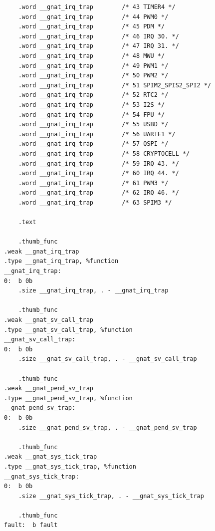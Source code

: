 \documentclass{article}
\begin{document}
\begin{lstlisting}
	.word __gnat_irq_trap        /* 43 TIMER4 */
	.word __gnat_irq_trap        /* 44 PWM0 */
	.word __gnat_irq_trap        /* 45 PDM */
	.word __gnat_irq_trap        /* 46 IRQ 30. */
	.word __gnat_irq_trap        /* 47 IRQ 31. */
	.word __gnat_irq_trap        /* 48 MWU */
	.word __gnat_irq_trap        /* 49 PWM1 */
	.word __gnat_irq_trap        /* 50 PWM2 */
	.word __gnat_irq_trap        /* 51 SPIM2_SPIS2_SPI2 */
	.word __gnat_irq_trap        /* 52 RTC2 */
	.word __gnat_irq_trap        /* 53 I2S */
	.word __gnat_irq_trap        /* 54 FPU */
	.word __gnat_irq_trap        /* 55 USBD */
	.word __gnat_irq_trap        /* 56 UARTE1 */
	.word __gnat_irq_trap        /* 57 QSPI */
	.word __gnat_irq_trap        /* 58 CRYPTOCELL */
	.word __gnat_irq_trap        /* 59 IRQ 43. */
	.word __gnat_irq_trap        /* 60 IRQ 44. */
	.word __gnat_irq_trap        /* 61 PWM3 */
	.word __gnat_irq_trap        /* 62 IRQ 46. */
	.word __gnat_irq_trap        /* 63 SPIM3 */

	.text

	.thumb_func
.weak __gnat_irq_trap
.type __gnat_irq_trap, %function
__gnat_irq_trap:
0:	b 0b
	.size __gnat_irq_trap, . - __gnat_irq_trap

	.thumb_func
.weak __gnat_sv_call_trap
.type __gnat_sv_call_trap, %function
__gnat_sv_call_trap:
0:	b 0b
	.size __gnat_sv_call_trap, . - __gnat_sv_call_trap

	.thumb_func
.weak __gnat_pend_sv_trap
.type __gnat_pend_sv_trap, %function
__gnat_pend_sv_trap:
0:	b 0b
	.size __gnat_pend_sv_trap, . - __gnat_pend_sv_trap

	.thumb_func
.weak __gnat_sys_tick_trap
.type __gnat_sys_tick_trap, %function
__gnat_sys_tick_trap:
0:	b 0b
	.size __gnat_sys_tick_trap, . - __gnat_sys_tick_trap

	.thumb_func
fault:	b fault
\end{lstlisting}
\end{document}
